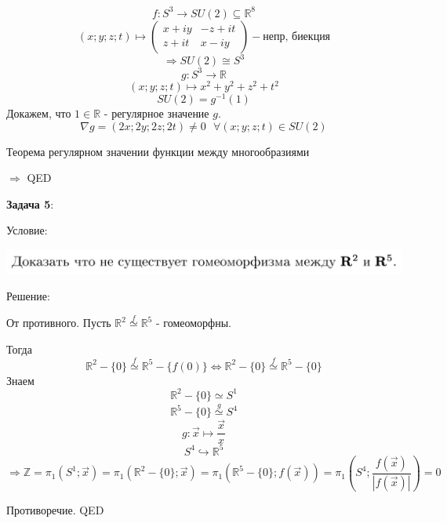 \documentclass[12pt]{article}
\begin{document}
\begin{large}
\[\]
\[
    f : S^3 \longrightarrow SU(2) \subseteq \mathbb{R}^8
\]
\begin{equation*}
    (x; y; z; t) \longmapsto
    \begin{pmatrix}
        x + iy & -z+it\\
        z+it & x-iy
    \end{pmatrix} - \text{непр, биекция}
\end{equation*}
\[
    \Rightarrow SU(2) \cong S^3
\]
\[
    g : S^3 \longrightarrow \mathbb{R}
\]
\[
    (x; y; z; t) \longmapsto x^2 + y^2 + z^2 + t^2
\]
\[
    SU(2) = g^{-1}(1)
\]
Докажем, что $1 \in \mathbb{R}$ - регулярное значение $g$.
\[
    \nabla g = (2x; 2y; 2z; 2t) \neq 0 \, \, \, \, \forall (x; y; z; t) \in SU(2)
\]
\par Теорема регулярном значении функции между многообразиями
\par $\Rightarrow$ QED

\par \textbf{Задача 5}:
\par Условие:
\par
\includegraphics[width=1\textwidth]{photo_5.png}
\par Решение:
\par От противного. Пусть $\mathbb{R}^2 \overset{f}{\simeq} \mathbb{R}^5$ - гомеоморфны.
\par Тогда
\[
    \mathbb{R}^2 - \{0\} \overset{f}{\simeq} \mathbb{R}^5 - \{f(0)\} \Leftrightarrow \mathbb{R}^2 - \{0\} \overset{f}{\simeq} \mathbb{R}^5 - \{0\}
\]
Знаем
\[
    \mathbb{R}^2 - \{0\} \simeq S^1
\]
\[
    \mathbb{R}^5 - \{0\} \overset{g}{\simeq} S^4
\]
\[
    g: \vec{x} \longmapsto \frac{\vec{x}}{x}
\]
\[
    S^4 \hookrightarrow \mathbb{R}^5
\]
\[
    \Rightarrow \mathbb{Z} = \pi_1\left( S^1; \vec{x} \right) = \pi_1\left( \mathbb{R}^2 - \{0\}; \vec{x} \right) = \pi_1\left( \mathbb{R}^5 - \{0\}; f(\vec{x}) \right) = \pi_1\left( S^4; \frac{f(\vec{x})}{|f(\vec{x})|} \right) = 0
\]
\par Противоречие. QED


\end{large}
\end{document}
